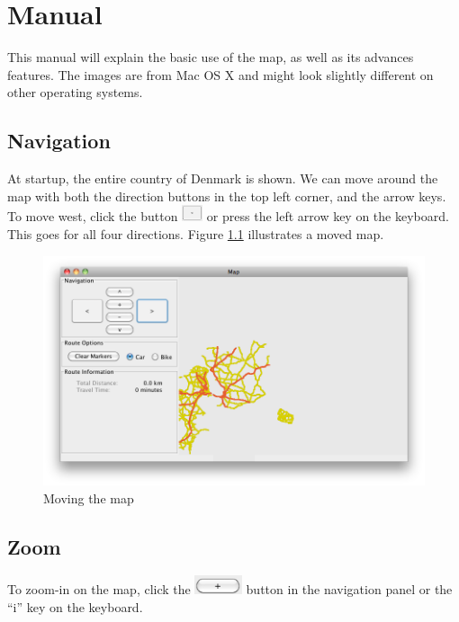 \chapter{Manual}
\label{MAN}

This manual will explain the basic use of the map, as well as its
advances features. The images are from Mac OS X and might look slightly
different on other operating systems.

\section{Navigation}
\label{MAN-N}
At startup, the entire country of Denmark is shown. We can move around the
map with both the direction buttons in the top left corner, and the arrow keys.
To move west, click the button
\includegraphics[height=1.3em]{images/westbutton.png} or press the left arrow
key on the keyboard. This goes for all four directions. Figure \ref{MAN-N-MOV}
illustrates a moved map.

\begin{figure}[h!]
\centering
\includegraphics[width=1\linewidth]{images/man-move.png}
\caption{Moving the map}
\label{MAN-N-MOV}
\end{figure}

\section{Zoom}
\label{MAN-Z}
To zoom-in on the map, click the
\includegraphics[height=1.5em]{images/zoominbutton.png} button in the navigation
panel or the ``i'' key on the keyboard.

